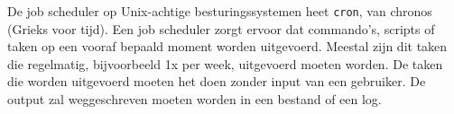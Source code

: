 De job scheduler op Unix-achtige besturingssystemen heet \texttt{cron}, van chronos (Grieks voor tijd). Een job scheduler zorgt ervoor dat commando's, scripts of taken op een vooraf bepaald moment worden uitgevoerd. Meestal zijn dit taken die regelmatig, bijvoorbeeld 1x per week, uitgevoerd moeten worden. De taken die worden uitgevoerd moeten het doen zonder input van een gebruiker. De output zal weggeschreven moeten worden in een bestand of een log.

